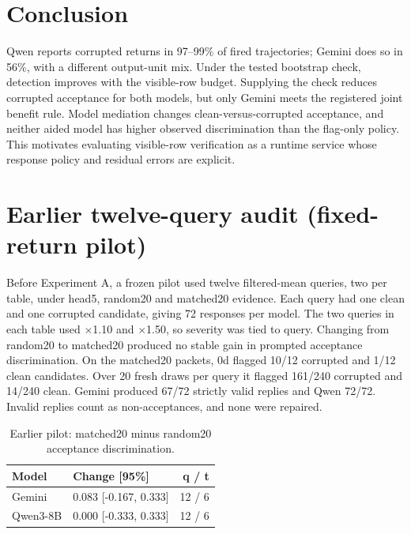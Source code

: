 \documentclass[letterpaper]{article}
\begin{document}
\section{Conclusion}

Qwen reports corrupted returns in 97--99\% of fired trajectories; Gemini does so in 56\%, with a different output-unit mix. Under the tested bootstrap check, detection improves with the visible-row budget. Supplying the check reduces corrupted acceptance for both models, but only Gemini meets the registered joint benefit rule. Model mediation changes clean-versus-corrupted acceptance, and neither aided model has higher observed discrimination than the flag-only policy. This motivates evaluating visible-row verification as a runtime service whose response policy and residual errors are explicit.


\nocite{Horst2020,Quinlan1993,Fanaee2013,Nash1994,Cortez2009,Cortez2008}



\FloatBarrier

\appendix

\section{Earlier twelve-query audit (fixed-return pilot)}

Before Experiment A, a frozen pilot used twelve filtered-mean queries, two per table, under head5, random20 and matched20 evidence. Each query had one clean and one corrupted candidate, giving 72 responses per model. The two queries in each table used \(\times\)1.10 and \(\times\)1.50, so severity was tied to query. Changing from random20 to matched20 produced no stable gain in prompted acceptance discrimination. On the matched20 packets, 0d flagged 10/12 corrupted and 1/12 clean candidates. Over 20 fresh draws per query it flagged 161/240 corrupted and 14/240 clean. Gemini produced 67/72 strictly valid replies and Qwen 72/72. Invalid replies count as non-acceptances, and none were repaired.


\begin{table}[tbp]
\centering
{\small
\setlength{\tabcolsep}{3pt}
\begin{tabular}{llr}
\toprule
Model & Change [95\%] & q / t \\ \midrule
Gemini & 0.083 [-0.167, 0.333] & 12 / 6 \\
Qwen3-8B & 0.000 [-0.333, 0.333] & 12 / 6 \\
\bottomrule
\end{tabular}
}

\caption{Earlier pilot: matched20 minus random20 acceptance discrimination.}
\label{tab:contrasts}
\end{table}
\end{document}
